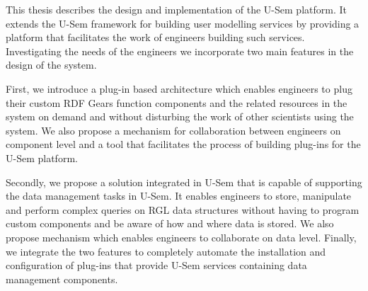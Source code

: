 This thesis describes the design and implementation of the U-Sem platform. It extends the U-Sem framework for building user modelling services by providing a platform that facilitates the work of engineers building such services. Investigating the needs of the engineers we incorporate two main features in the design of the system.

First, we introduce a plug-in based architecture which enables engineers to plug their custom RDF Gears function components and the related resources in the system on demand and without disturbing the work of other scientists using the system. We also propose a mechanism for collaboration between engineers on component level and a tool that facilitates the process of building plug-ins for the U-Sem platform. 

Secondly, we propose a solution integrated in U-Sem that is capable of supporting the data management tasks in U-Sem. It enables engineers to store, manipulate and perform complex queries on RGL data structures without having to program custom components and be aware of how and where data is stored. We also propose mechanism which enables engineers to collaborate on data level. Finally, we integrate the two features to completely automate the installation and configuration of plug-ins that provide U-Sem services containing data management components.